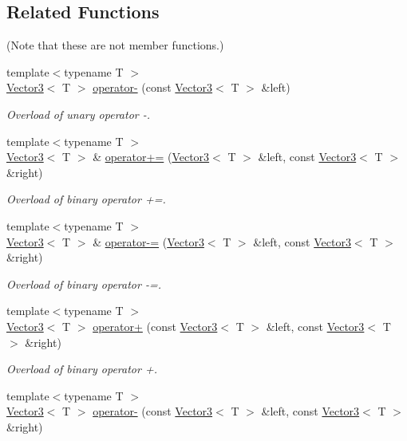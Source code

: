 \subsection*{Related Functions}
(Note that these are not member functions.) \begin{DoxyCompactItemize}
\item 
{\footnotesize template$<$typename T $>$ }\\\hyperlink{class_vector3}{Vector3}$<$ T $>$ \hyperlink{class_vector3_a9b75d2fb9b0f2fd9fe33f8f06f9dda75}{operator-\/} (const \hyperlink{class_vector3}{Vector3}$<$ T $>$ \&left)
\begin{DoxyCompactList}\small\item\em Overload of unary operator -\/. \end{DoxyCompactList}\item 
{\footnotesize template$<$typename T $>$ }\\\hyperlink{class_vector3}{Vector3}$<$ T $>$ \& \hyperlink{class_vector3_abc28859af163c63318ea2723b81c5ad9}{operator+=} (\hyperlink{class_vector3}{Vector3}$<$ T $>$ \&left, const \hyperlink{class_vector3}{Vector3}$<$ T $>$ \&right)
\begin{DoxyCompactList}\small\item\em Overload of binary operator +=. \end{DoxyCompactList}\item 
{\footnotesize template$<$typename T $>$ }\\\hyperlink{class_vector3}{Vector3}$<$ T $>$ \& \hyperlink{class_vector3_aa465672d2a4ee5fd354e585cf08d2ab9}{operator-\/=} (\hyperlink{class_vector3}{Vector3}$<$ T $>$ \&left, const \hyperlink{class_vector3}{Vector3}$<$ T $>$ \&right)
\begin{DoxyCompactList}\small\item\em Overload of binary operator -\/=. \end{DoxyCompactList}\item 
{\footnotesize template$<$typename T $>$ }\\\hyperlink{class_vector3}{Vector3}$<$ T $>$ \hyperlink{class_vector3_a6500a0cb00e07801e9e9d7e96852ddd3}{operator+} (const \hyperlink{class_vector3}{Vector3}$<$ T $>$ \&left, const \hyperlink{class_vector3}{Vector3}$<$ T $>$ \&right)
\begin{DoxyCompactList}\small\item\em Overload of binary operator +. \end{DoxyCompactList}\item 
{\footnotesize template$<$typename T $>$ }\\\hyperlink{class_vector3}{Vector3}$<$ T $>$ \hyperlink{class_vector3_abe0b9411c00cf807bf8a5f835874bd2a}{operator-\/} (const \hyperlink{class_vector3}{Vector3}$<$ T $>$ \&left, const \hyperlink{class_vector3}{Vector3}$<$ T $>$ \&right)

\end{DoxyCompactItemize}
